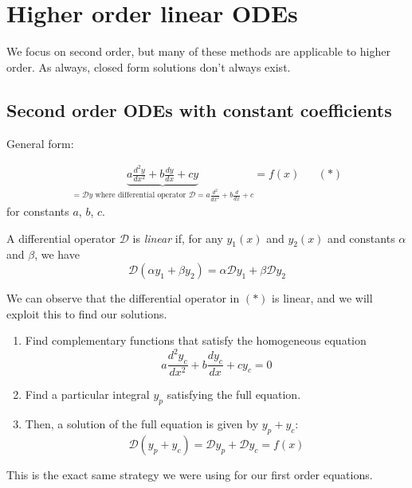 \documentclass{../template/note}
\begin{document}

    \section{Higher order linear ODEs}

    We focus on second order, but many of these methods are applicable to higher order. As always, closed form solutions don't always exist.

    \subsection{Second order ODEs with constant coefficients}

    General form:

    \begin{align*}
        \underbrace{a \frac{d^2y}{dx^2} + b\frac{dy}{dx} + cy}_{=\mathcal Dy \text{ where differential operator } \mathcal D = a \frac{d^2}{dx^2} + b \frac{d}{dx} + c} = f(x) && (*)
    \end{align*}
    for constants \(a\), \(b\), \(c\).

    \begin{definition}
        A differential operator \(\mathcal D\) is \emph{linear} if, for any \(y_1(x)\) and \(y_2(x)\) and constants \(\alpha\) and \(\beta\), we have
        \[
            \mathcal D(\alpha y_1 + \beta y_2) = \alpha \mathcal D y_1 + \beta \mathcal D y_2
        \]
    \end{definition}
    
    We can observe that the differential operator in \((*)\) is linear, and we will exploit this to find our solutions.

    \begin{enumerate}[label=\protect\circled{\arabic*}]
        \item Find complementary functions that satisfy the homogeneous equation
        \[
            a \frac{d^2y_c}{dx^2} + b\frac{dy_c}{dx} + cy_c = 0
        \]
        \item Find a particular integral \(y_p\) satisfying the full equation.
        \item Then, a solution of the full equation is given by \(y_p + y_c\):
        \[
            \mathcal D(y_p + y_c) = \mathcal Dy_p + \mathcal Dy_c = f(x)
        \]
    \end{enumerate}
    
    \begin{remark*}
        This is the exact same strategy we were using for our first order equations.
    \end{remark*}
    
\end{document}
